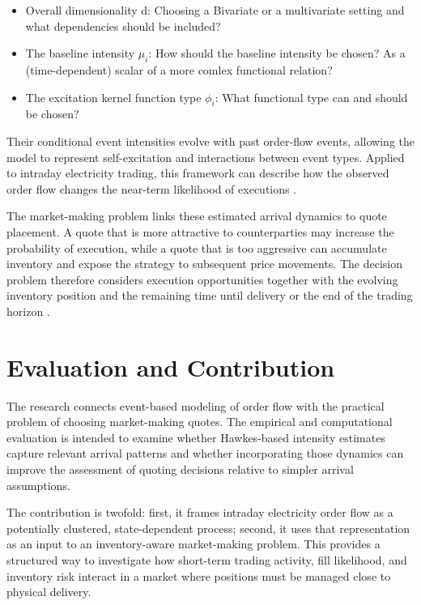 \documentclass[11pt,a4paper]{cau_exec_summary}
\begin{document}
\begin{itemize}
    \item Overall dimensionality d: Choosing a Bivariate or a multivariate setting and what dependencies should be included?
    \item The baseline intensity $\mu_{i}$: How should the baseline intensity be chosen? As a (time-dependent) scalar of a more comlex functional relation?
    \item The excitation kernel function type $\phi_{i}$: What functional type can and should be chosen?
\end{itemize}


Their conditional event intensities evolve with past order-flow events, allowing the model to represent self-excitation and interactions between event types. Applied to intraday electricity trading, this framework can describe how the observed order flow changes the near-term likelihood of executions \parencite{deschatre2022electricity,favetto2019european}.

The market-making problem links these estimated arrival dynamics to quote placement. A quote that is more attractive to counterparties may increase the probability of execution, while a quote that is too aggressive can accumulate inventory and expose the strategy to subsequent price movements. The decision problem therefore considers execution opportunities together with the evolving inventory position and the remaining time until delivery or the end of the trading horizon \parencite{von2017optimal,korhonen2025market}.
\section{Evaluation and Contribution}
The research connects event-based modeling of order flow with the practical problem of choosing market-making quotes. The empirical and computational evaluation is intended to examine whether Hawkes-based intensity estimates capture relevant arrival patterns and whether incorporating those dynamics can improve the assessment of quoting decisions relative to simpler arrival assumptions.

The contribution is twofold: first, it frames intraday electricity order flow as a potentially clustered, state-dependent process; second, it uses that representation as an input to an inventory-aware market-making problem. This provides a structured way to investigate how short-term trading activity, fill likelihood, and inventory risk interact in a market where positions must be managed close to physical delivery.
\end{document}
